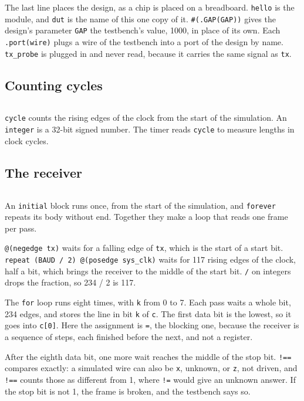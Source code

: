 \documentclass[11pt,a4paper]{article}
\begin{document}
The last line places the design, as a chip is placed on a breadboard. \texttt{hello} is the module, and \texttt{dut} is the name of this one copy of it. \texttt{\#(.GAP(GAP))} gives the design’s parameter \texttt{GAP} the testbench’s value, 1000, in place of its own. Each \texttt{.port(wire)} plugs a wire of the testbench into a port of the design by name. \texttt{tx\_probe} is plugged in and never read, because it carries the same signal as \texttt{tx}.

\subsection*{Counting cycles}

\inputminted[firstline=20, lastline=21]{verilog}{../sim/hello_tb.v}

\texttt{cycle} counts the rising edges of the clock from the start of the simulation. An \texttt{integer} is a 32-bit signed number. The timer reads \texttt{cycle} to measure lengths in clock cycles.

\subsection*{The receiver}

\inputminted[firstline=23, lastline=37]{verilog}{../sim/hello_tb.v}

An \texttt{initial} block runs once, from the start of the simulation, and \texttt{forever} repeats its body without end. Together they make a loop that reads one frame per pass.

\texttt{@(negedge tx)} waits for a falling edge of \texttt{tx}, which is the start of a start bit. \texttt{repeat (BAUD / 2) @(posedge sys\_clk)} waits for 117 rising edges of the clock, half a bit, which brings the receiver to the middle of the start bit. \texttt{/} on integers drops the fraction, so 234 / 2 is 117.

The \texttt{for} loop runs eight times, with \texttt{k} from 0 to 7. Each pass waits a whole bit, 234 edges, and stores the line in bit \texttt{k} of \texttt{c}. The first data bit is the lowest, so it goes into \texttt{c[0]}. Here the assignment is \texttt{=}, the blocking one, because the receiver is a sequence of steps, each finished before the next, and not a register.

After the eighth data bit, one more wait reaches the middle of the stop bit. \texttt{!==} compares exactly: a simulated wire can also be \texttt{x}, unknown, or \texttt{z}, not driven, and \texttt{!==} counts those as different from 1, where \texttt{!=} would give an unknown answer. If the stop bit is not 1, the frame is broken, and the testbench says so.
\end{document}
